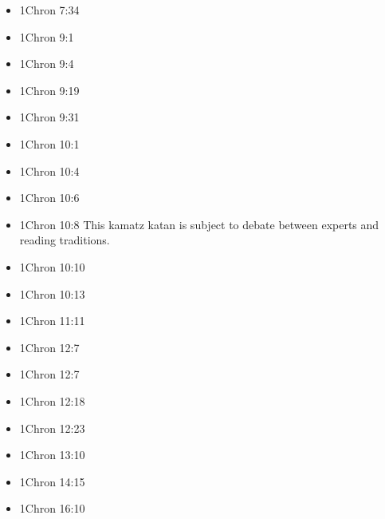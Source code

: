 \documentclass[14pt]{book}
\begin{document}
\begin{multicols}{2}
\begin{itemize}
						\item 1Chron 7:34
						
						\item 1Chron 9:1
						
						\item 1Chron 9:4
						
						\item 1Chron 9:19
						
						\item 1Chron 9:31
						
						\item 1Chron 10:1
						
						\item 1Chron 10:4
						
						\item 1Chron 10:6
						
						\item 1Chron 10:8 This kamatz katan is subject to debate between experts and reading traditions.
						
						\item 1Chron 10:10
						
						\item 1Chron 10:13
						
						\item 1Chron 11:11
						
						\item 1Chron 12:7
						
						\item 1Chron 12:7
						
						\item 1Chron 12:18
						
						\item 1Chron 12:23
						
						\item 1Chron 13:10
						
						\item 1Chron 14:15
						
						\item 1Chron 16:10
						

\end{itemize}
\end{multicols}
\end{document}
